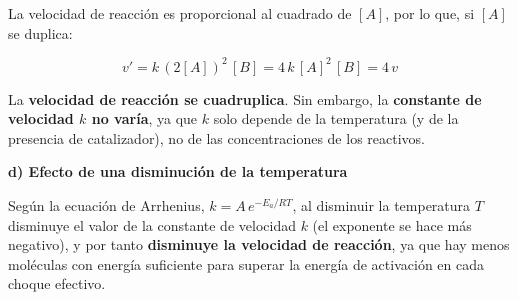 \begin{exerciseEVAU}
\begin{solu}
        La velocidad de reacción es proporcional al cuadrado de \([A]\), por lo que, si \([A]\) se duplica:

        \begin{equation*}
            v' = k\, (2[A])^2\, [B] = 4\, k\, [A]^2\, [B] = 4\, v
        \end{equation*}

        La \textbf{velocidad de reacción se cuadruplica}. Sin embargo, la \textbf{constante de velocidad \(k\) no varía}, ya que \(k\) solo depende de la temperatura (y de la presencia de catalizador), no de las concentraciones de los reactivos.

        \textbf{d) Efecto de una disminución de la temperatura}

        Según la ecuación de Arrhenius, \(k = A\, e^{-E_a/RT}\), al disminuir la temperatura \(T\) disminuye el valor de la constante de velocidad \(k\) (el exponente se hace más negativo), y por tanto \textbf{disminuye la velocidad de reacción}, ya que hay menos moléculas con energía suficiente para superar la energía de activación en cada choque efectivo.

    \end{solu}

\end{exerciseEVAU}

